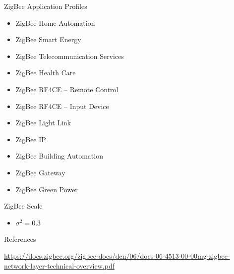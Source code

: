 \documentclass{beamer}
\begin{document}
\begin{frame}{ZigBee Application Profiles}
  \begin{itemize}
  	\item ZigBee Home Automation
    \item ZigBee Smart Energy
    \item ZigBee Telecommunication Services
    \item ZigBee Health Care
    \item ZigBee RF4CE – Remote Control
    \item ZigBee RF4CE – Input Device
    \item ZigBee Light Link
    \item ZigBee IP
    \item ZigBee Building Automation
    \item ZigBee Gateway
    \item ZigBee Green Power
  \end{itemize}
\end{frame}

\begin{frame}{ZigBee Scale}
  \begin{itemize}
	\item $\sigma^2 = 0.3$
  \end{itemize}
\end{frame}

\begin{frame}{References}
\begin{thebibliography}{9}
\url{https://docs.zigbee.org/zigbee-docs/dcn/06/docs-06-4513-00-00mg-zigbee-network-layer-technical-overview.pdf}
\end{thebibliography}
\end{frame}
\end{document}
